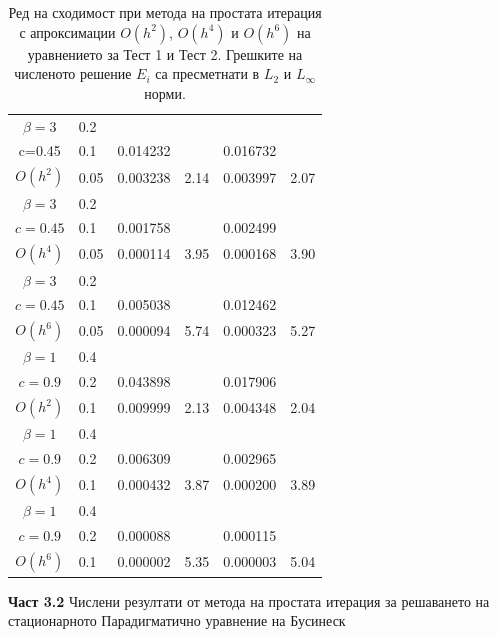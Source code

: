 \documentclass[a5paper]{article}
\theoremstyle{remark}
\begin{document}
\begin{large}
\begin{table}[ht]
\begin{small}
\begin{tabular}{||c|l|ll|ll||}
$\beta = 3$ 	&0.2    										&            &            &           &   \\
      c=0.45 	&0.1    & 0.014232  						&            & 0.016732 			&   \\
   $O(h^2)$     &0.05   & 0.003238  						&2.14  & 0.003997					& 2.07 \\
\hline 
$\beta = 3$   	&0.2   &            &            &             &    \\
      $c=0.45 $ &0.1   &   0.001758   &           &  0.002499  &   \\
       $O(h^4)$	&0.05  &  0.000114 & 3.95    & 0.000168  & 3.90  \\
\hline
$\beta = 3$   	&0.2   &            &        &                  &      \\
   $c=0.45$   	&0.1   &  0.005038 &           & 0.012462       &       \\
     $O(h^6)$	&0.05  &  0.000094  & 5.74  &  0.000323 & 5.27         \\
			\hline
			\hline 	
$\beta = 1$   	&0.4   &             &           &                & \\
     $c=0.9$     &0.2   &  0.043898  &             & 0.017906      &    \\
     $O(h^2)$	&0.1  & 0.009999 & 2.13       & 0.004348      & 2.04  \\
\hline 	
 $\beta = 1$   	&0.4  &            &               &               &     \\
     $c=0.9$  	&0.2   & 0.006309  &              & 0.002965      &        \\
     $O(h^4)$	&0.1  &  0.000432 &3.87        & 0.000200 &  3.89        \\
    \hline
 $\beta = 1$	&0.4   &             &        &               &        \\
   $ c=0.9$  	&0.2   &  0.000088  &        & 0.000115      &       \\
       $O(h^6)$	&0.1  &   0.000002 &5.35  & 0.000003 &   5.04       \\
	   \hline
			\hline 
		\end{tabular}
		\caption{\normalsize Ред на сходимост при метода на простата итерация с апроксимации $O(h^{2})$, $O(h^{4})$ и $O(h^{6})$ на уравнението за Тест  1 и Тест 2. Грешките на численото решение $E_i$ са пресметнати в $L_2$ и $L_\infty$ норми.}
\label{tab:a}
\end{small}
\end{table}
\FloatBarrier

\textbf{Част 3.2} Числени резултати от метода на простата итерация за решаването на стационарното Парадигматично уравнение на Бусинеск


\end{large}
\end{document}

